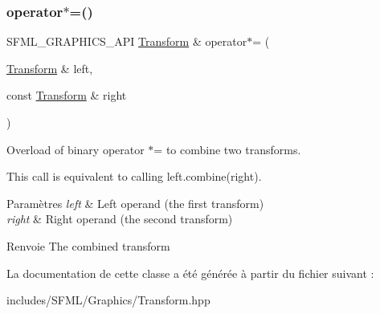\subsubsection{\texorpdfstring{operator$\ast$=()}{operator*=()}}
{\footnotesize\ttfamily S\+F\+M\+L\+\_\+\+G\+R\+A\+P\+H\+I\+C\+S\+\_\+\+A\+PI \hyperlink{classsf_1_1Transform}{Transform} \& operator$\ast$= (\begin{DoxyParamCaption}\item[{\hyperlink{classsf_1_1Transform}{Transform} \&}]{left,  }\item[{const \hyperlink{classsf_1_1Transform}{Transform} \&}]{right }\end{DoxyParamCaption})\hspace{0.3cm}{\ttfamily [related]}}



Overload of binary operator $\ast$= to combine two transforms. 

This call is equivalent to calling left.\+combine(right).


\begin{DoxyParams}{Paramètres}
{\em left} & Left operand (the first transform) \\
\hline
{\em right} & Right operand (the second transform)\\
\hline
\end{DoxyParams}
\begin{DoxyReturn}{Renvoie}
The combined transform 
\end{DoxyReturn}


La documentation de cette classe a été générée à partir du fichier suivant \+:\begin{DoxyCompactItemize}
\item 
includes/\+S\+F\+M\+L/\+Graphics/Transform.\+hpp\end{DoxyCompactItemize}
